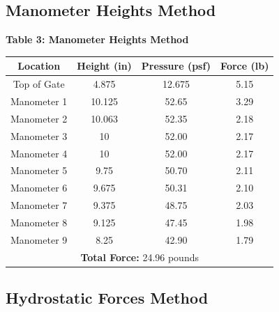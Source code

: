 \documentclass{article}
\begin{document}
\subsection{Manometer Heights Method}
\begin{center}
{\large{\bf Table 3: Manometer Heights Method\\}}
\vspace{3mm}
    \begin{tabular}{|cccc|} 
        \hline
        \textbf{Location} & \textbf{Height (in)} & \textbf{Pressure (psf)} & \textbf{Force (lb)}  \\ 
        \hline
        Top of Gate       & 4.875                & 12.675                  & 5.15                 \\
        Manometer 1       & 10.125                & 52.65                  & 3.29                 \\
        Manometer 2       & 10.063                & 52.35                   & 2.18                 \\
        Manometer 3       & 10                & 52.00                   & 2.17                 \\
        Manometer 4       & 10                 & 52.00                   & 2.17                 \\
        Manometer 5       & 9.75                & 50.70                   & 2.11                 \\
        Manometer 6       & 9.675                 & 50.31                   & 2.10                 \\
        Manometer 7       & 9.375                & 48.75                   & 2.03                 \\
        Manometer 8       & 9.125                 & 47.45                   & 1.98                 \\
        Manometer 9       & 8.25                 & 42.90                   & 1.79                 \\ 
        \hline
        \multicolumn{4}{|c|}{\textbf{Total Force:} 24.96 pounds}                                      \\
        \hline
    \end{tabular}
\end{center}
\subsection{Hydrostatic Forces Method}
\end{document}
